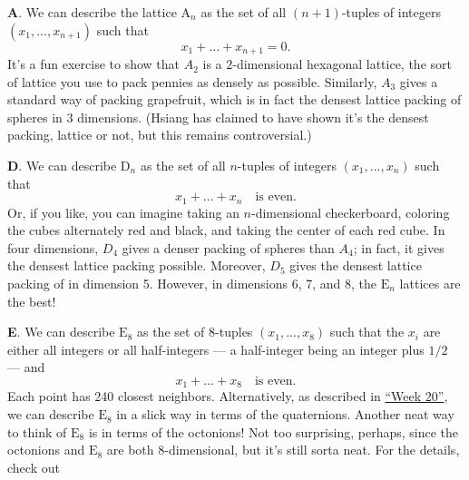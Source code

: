 \documentclass{article}
\def\tightlist{}
\renewcommand{\texttt}[1]{%
  \begingroup
  \ttfamily
  \begingroup\lccode`~=`/\lowercase{\endgroup\def~}{/\discretionary{}{}{}}%
  \begingroup\lccode`~=`[\lowercase{\endgroup\def~}{[\discretionary{}{}{}}%
  \begingroup\lccode`~=`.\lowercase{\endgroup\def~}{.\discretionary{}{}{}}%
  \catcode`/=\active\catcode`[=\active\catcode`.=\active
  \scantokens{#1\noexpand}%
  \endgroup
}
\begin{document}
\textbf{A}. We can describe the lattice \(\mathrm{A}_n\) as the set of
all \((n+1)\)-tuples of integers \((x_1,...,x_{n+1})\) such that
\[x_1+\ldots+x_{n+1}=0.\] It's a fun exercise to show that \(A_2\) is a
\(2\)-dimensional hexagonal lattice, the sort of lattice you use to pack
pennies as densely as possible. Similarly, \(A_3\) gives a standard way
of packing grapefruit, which is in fact the densest lattice packing of
spheres in 3 dimensions. (Hsiang has claimed to have shown it's the
densest packing, lattice or not, but this remains controversial.)

\textbf{D}. We can describe \(\mathrm{D}_n\) as the set of all
\(n\)-tuples of integers \((x_1,...,x_n)\) such that
\[x_1+\ldots+x_n\quad\text{is even}.\] Or, if you like, you can imagine
taking an \(n\)-dimensional checkerboard, coloring the cubes alternately
red and black, and taking the center of each red cube. In four
dimensions, \(D_4\) gives a denser packing of spheres than \(A_4\); in
fact, it gives the densest lattice packing possible. Moreover, \(D_5\)
gives the densest lattice packing of in dimension 5. However, in
dimensions 6, 7, and 8, the \(\mathrm{E}_n\) lattices are the best!

\textbf{E}. We can describe \(\mathrm{E}_8\) as the set of 8-tuples
\((x_1,...,x_8)\) such that the \(x_i\) are either all integers or all
half-integers --- a half-integer being an integer plus \(1/2\) --- and
\[x_1+\ldots+x_8\quad\text{is even}.\] Each point has 240 closest
neighbors. Alternatively, as described in
\protect\hyperlink{week20}{``Week 20''}, we can describe
\(\mathrm{E}_8\) in a slick way in terms of the quaternions. Another
neat way to think of \(\mathrm{E}_8\) is in terms of the octonions! Not
too surprising, perhaps, since the octonions and \(\mathrm{E}_8\) are
both \(8\)-dimensional, but it's still sorta neat. For the details,
check out

\end{document}
